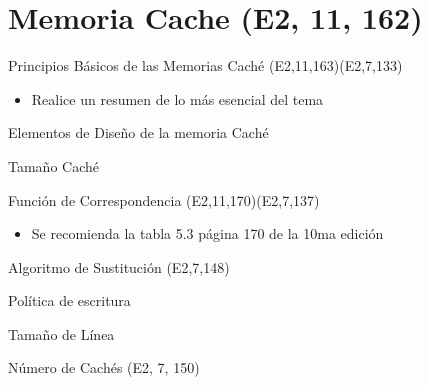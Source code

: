 \documentclass[presentation]{beamer}
\begin{document}
\section{Memoria Cache (E2, 11, 162)}
\label{sec:org8bc9988}
\begin{frame}[label={sec:org78fd263}]{Principios Básicos de las Memorias Caché (E2,11,163)(E2,7,133)}
\begin{itemize}
\item Realice un resumen de lo más esencial del tema
\end{itemize}
\end{frame}
\begin{frame}[label={sec:org14539d4}]{Elementos de Diseño de la memoria Caché}
\end{frame}
\begin{frame}[label={sec:org46e052c}]{Tamaño Caché}
\end{frame}
\begin{frame}[label={sec:org4398bc6}]{Función de Correspondencia (E2,11,170)(E2,7,137)}
\begin{itemize}
\item Se recomienda la tabla 5.3 página 170 de la 10ma edición
\end{itemize}
\end{frame}
\begin{frame}[label={sec:org18bec8d}]{Algoritmo de Sustitución (E2,7,148)}
\end{frame}
\begin{frame}[label={sec:org3db2b60}]{Política de escritura}
\end{frame}
\begin{frame}[label={sec:org67c956b}]{Tamaño de Línea}
\end{frame}
\begin{frame}[label={sec:orgca54c87}]{Número de Cachés (E2, 7, 150)}
\end{frame}
\end{document}
